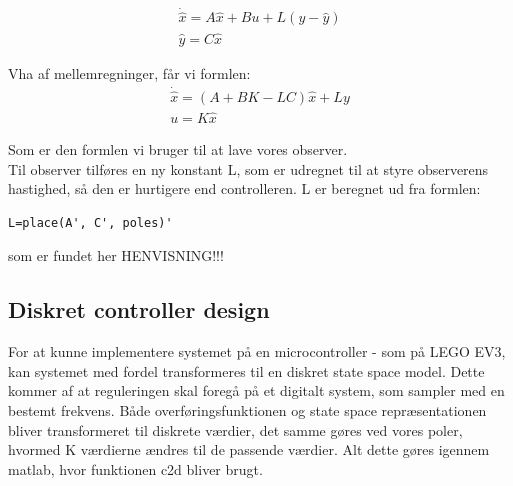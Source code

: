 \begin{gather}
\dot{\hat{x}}=A\hat{x}+Bu+L(y-\hat{y}) \\
\hat{y}=C\hat{x}
\end{gather}

Vha af mellemregninger, får vi formlen: 
\begin{gather}
\dot{\hat{x}}=(A+BK-LC)\hat{x}+Ly \\
u=K\hat{x}
\end{gather}

Som er den formlen vi bruger til at lave vores observer.\\

Til observer tilføres en ny konstant L, som er udregnet til at styre observerens hastighed, så den er hurtigere end controlleren. L er beregnet ud fra formlen:
\begin{lstlisting}[frame=single]
L=place(A', C', poles)'
\end{lstlisting}

som er fundet her HENVISNING!!!

\subsection{Diskret controller design}
For at kunne implementere systemet på en microcontroller - som på LEGO EV3, kan systemet med fordel transformeres til en diskret state space model. Dette kommer af at reguleringen skal foregå på et digitalt system, som sampler med en bestemt frekvens. Både overføringsfunktionen og state space repræsentationen bliver transformeret til diskrete værdier, det samme gøres ved vores poler, hvormed K værdierne ændres til de passende værdier. Alt dette gøres igennem matlab, hvor funktionen c2d bliver brugt.


